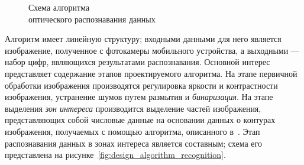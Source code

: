 \begin{figure}[h!]
  \centering
  \caption{Схема алгоритма \\ оптического распознавания данных}
  \label{fig:design_algorithm_basic}
\end{figure}

Алгоритм имеет линейную структуру; входными данными для него является изображение,
полученное с фотокамеры мобильного устройства, а выходными --- набор цифр,
являющихся результатами распознавания.
Основной интерес представляет содержание этапов проектируемого алгоритма.
На этапе первичной обработки изображения производятся
регулировка яркости и контрастности изображения,
устранение шумов путем размытия и \textit{бинаризация}.
На этапе выделения \textit{зон интереса} производится выделение частей изображения,
представляющих собой числовые данные на основании данных
о контурах изображения, получаемых с помощью алгоритма, описанного в~\cite{suzuki85}.
Этап распознавания данных в зонах интереса является составным;
схема его представлена на рисунке~\ref{fig:design_algorithm_recognition}.

